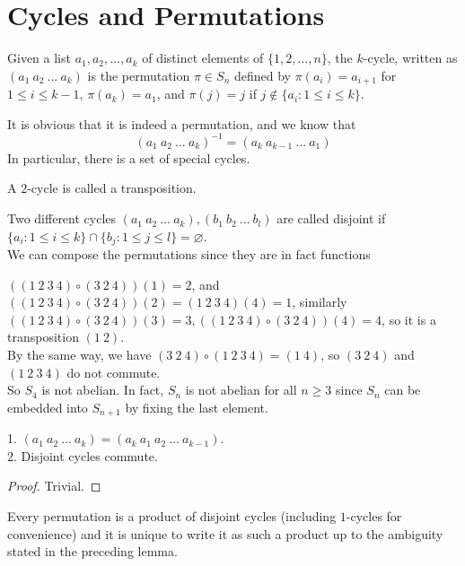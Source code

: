 \section{Cycles and Permutations}
\begin{definition}
    Given a list $a_1,a_2,\ldots,a_k$ of distinct elements of $\{1,2,\ldots,n\}$, the $k$-cycle, written as $(a_1\ a_2\ \ldots\ a_k)$ is the permutation $\pi\in S_n$ defined by $\pi(a_i)=a_{i+1}$ for $1\le i\le k-1$, $\pi(a_k)=a_1$, and $\pi(j)=j$ if $j\notin\{a_i:1\le i\le k\}$.
\end{definition}
It is obvious that it is indeed a permutation, and we know that
$$(a_1\ a_2\ \ldots\ a_k)^{-1}=(a_k\ a_{k-1}\ \ldots\ a_1)$$
In particular, there is a set of special cycles.
\begin{definition}
    A $2$-cycle is called a transposition.
\end{definition}
Two different cycles $(a_1\ a_2\ \ldots\ a_k),(b_1\ b_2\ \ldots\ b_l)$ are called disjoint if $\{a_i:1\le i\le k\}\cap\{b_j:1\le j\le l\}=\varnothing$.\\
We can compose the permutations since they are in fact functions
\begin{example}
    $((1\ 2\ 3\ 4)\circ(3\ 2\ 4))(1)=2$, and $((1\ 2\ 3\ 4)\circ(3\ 2\ 4))(2)=(1\ 2\ 3\ 4)(4)=1$, similarly $((1\ 2\ 3\ 4)\circ(3\ 2\ 4))(3)=3,((1\ 2\ 3\ 4)\circ(3\ 2\ 4))(4)=4$, so it is a transposition $(1\ 2)$.\\
    By the same way, we have $(3\ 2\ 4)\circ (1\ 2\ 3\ 4)=(1\ 4)$, so $(3\ 2\ 4)$ and $(1\ 2\ 3\ 4)$ do not commute.\\
    So $S_4$ is not abelian.
    In fact, $S_n$ is not abelian for all $n\ge 3$ since $S_n$ can be embedded into $S_{n+1}$ by fixing the last element.
\end{example}
\begin{lemma}
    1. $(a_1\ a_2\ \ldots\ a_k)=(a_k\ a_1\ a_2\ \ldots\ a_{k-1})$.\\
    2. Disjoint cycles commute.
\end{lemma}
\begin{proof}
    Trivial.
\end{proof}
\begin{theorem}\label{disjoint_cycles}
    Every permutation is a product of disjoint cycles (including $1$-cycles for convenience) and it is unique to write it as such a product up to the ambiguity stated in the preceding lemma.
\end{theorem}
